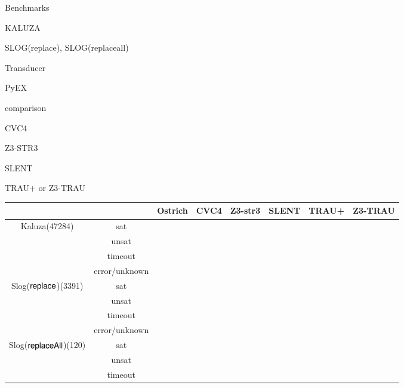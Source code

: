 
Benchmarks

KALUZA

SLOG(replace), SLOG(replaceall)

Transducer

PyEX \cite{ReynoldsWBBLT17}


comparison

CVC4

Z3-STR3

SLENT

TRAU+ or Z3-TRAU

\begin{table}[htbp]
\begin{center}
\begin{tabular}{|c|c|c|c|c|c|c|c|}
\hline
& & Ostrich & CVC4 & Z3-str3 & SLENT & TRAU+ & Z3-TRAU\\
\hline
\multirow{4}{*}{Kaluza(47284)} & \cellcolor{Gray} sat & \cellcolor{Gray} & \cellcolor{Gray} & \cellcolor{Gray} & \cellcolor{Gray} & \cellcolor{Gray} & \cellcolor{Gray}\\
\cline{2-8}
 & unsat &  &  &  &  & &\\
\cline{2-8}
 & \cellcolor{Gray}  timeout & \cellcolor{Gray} & \cellcolor{Gray} & \cellcolor{Gray} & \cellcolor{Gray} &\cellcolor{Gray} &\cellcolor{Gray} \\
\cline{2-8}
 & error/unknown &  &  &  &  & &\\
\hline
\multirow{4}{*}{Slog($\mathsf{replace}$)(3391)} & \cellcolor{Gray} sat & \cellcolor{Gray} & \cellcolor{Gray} & \cellcolor{Gray} & \cellcolor{Gray} & \cellcolor{Gray} & \cellcolor{Gray} \\
\cline{2-8}
 & unsat &  &  &  &  & &\\
\cline{2-8}
 & \cellcolor{Gray}  timeout & \cellcolor{Gray} & \cellcolor{Gray} & \cellcolor{Gray} & \cellcolor{Gray} &\cellcolor{Gray} &\cellcolor{Gray} \\
\cline{2-8}
 & error/unknown &  &  &  &  & &\\
\hline
\multirow{4}{*}{Slog($\mathsf{replaceAll}$)(120)} & \cellcolor{Gray} sat & \cellcolor{Gray} & \cellcolor{Gray} & \cellcolor{Gray} & \cellcolor{Gray} & \cellcolor{Gray} & \cellcolor{Gray}\\
\cline{2-8}
 & unsat &  &  &  &  & &\\
\cline{2-8}
 & \cellcolor{Gray}  timeout & \cellcolor{Gray} & \cellcolor{Gray} & \cellcolor{Gray} & \cellcolor{Gray} &\cellcolor{Gray} &\cellcolor{Gray} \\

\end{tabular}
\end{center}
\end{table}
